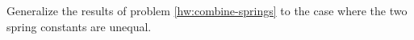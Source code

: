  Generalize the results of problem \ref{hw:combine-springs} to the case where
the two spring constants are unequal.
